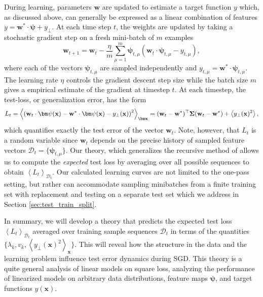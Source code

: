 \documentclass{article} %
\def\x{\bm x}
\def\w{\bm w}
\def\x{\mathbf x}
\def\w{\mathbf w}
\def\bSigma{\mathbf \Sigma}
\begin{document}
During learning, parameters $\w$ are updated to estimate a target function $y$ which, as discussed above, can generally be expressed as a linear combination of features $y = \w^* \cdot \bm\psi + y_{\perp}$. %
At each time step $t$, the weights are updated by taking a stochastic gradient step on a fresh mini-batch of $m$ examples 
\begin{equation}
    \w_{t+1} = \w_t - \frac{\eta}{m} \sum_{\mu = 1}^m \bm\psi_{t,\mu} \left( \w_t \cdot \bm\psi_{t,\mu} - y_{t,\mu} \right)
,\end{equation}
where each of the vectors $\bm\psi_{t,\mu}$ are sampled independently and $y_{t,\mu} = \w^* \cdot \bm\psi_{t,\mu}$. The learning rate $\eta$ controls the gradient descent step size while the batch size $m$ gives a empirical estimate of the gradient at timestep $t$. At each timestep, the test-loss, or generalization error, has the form
\begin{equation}
    L_t = \left< \left( \w_t \cdot \bm\psi(\x) - \w^* \cdot \bm\psi(\x) - y_{\perp}(\x) \right)^2 \right>_{\bm \x} = (\w_t-\w^*)^\top \bSigma (\w_t-\w^*) + \left< y_{\perp}(\x)^2 \right>,
\end{equation}
which quantifies exactly the test error of the vector $\w_t$. Note, however, that $L_t$ is a random variable since $\w_t$ depends on the precise history of sampled feature vectors $\mathcal D_t = \{ \bm\psi_{t,\mu} \}$. Our theory, which generalizes the recursive method of \citep{Werfel} allows us to compute the \textit{expected} test loss by averaging over all possible sequences to obtain $\left< L_t\right>_{\mathcal D_t}$. Our calculated learning curves are not limited to the one-pass setting, but rather can accommodate sampling minibatches from a finite training set with replacement and testing on a separate test set which we address in Section \ref{sec:test_train_split}.

In summary, we will develop a theory that predicts the expected test loss $\left< L_t \right>_{\mathcal D_t}$ averaged over training sample sequences $\mathcal D_t$ in terms of the quantities $\{ \lambda_k , v_k, \left< y_{\perp}(\x)^2 \right>_\x \}$. This will reveal how the structure in the data and the learning problem influence test error dynamics during SGD. This theory is a quite general analysis of linear models on square loss, analyzing the performance of linearized models on arbitrary data distributions, feature maps $\bm\psi$, and target functions $y(\x)$. 
\end{document}
